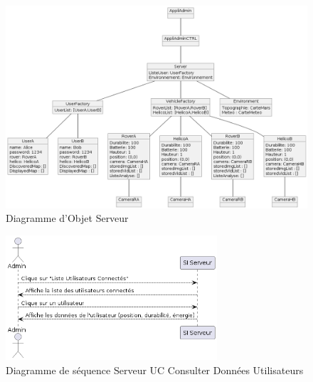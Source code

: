 \documentclass[12pt,a4paper]{scrartcl}
\begin{document}
\begin{figure}[h]
    \centering
    \includegraphics[width=1\textwidth]{Diag_Obj_Admin.png}
    \caption{Diagramme d'Objet Serveur}\label{obj_serv}
\end{figure}

\begin{figure}[h]
    \centering
    \includegraphics[width=0.7\textwidth]{diag_seq_admin_consulter.png}
    \caption{Diagramme de séquence Serveur UC Consulter Données Utilisateurs }\label{seq1_serv}
\end{figure}
\end{document}
